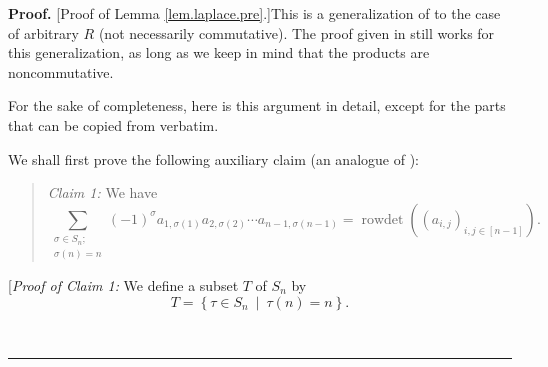 \documentclass[numbers=enddot,12pt,final,onecolumn,notitlepage,english]{scrartcl}%
\theoremstyle{definition}
\newenvironment{statement}{\begin{quote}}{\end{quote}}
\newenvironment{proof}[1][Proof]{\noindent\textbf{#1.} }{\ \rule{0.5em}{0.5em}}
\let\sumnonlimits\sum
\renewcommand{\sum}{\sumnonlimits\limits}
\newenvironment{verlong}{}{}
\begin{document}
\begin{verlong}
\begin{proof}
[Proof of Lemma \ref{lem.laplace.pre}.]This is a generalization of
\cite[Theorem 6.43]{detnotes} to the case of arbitrary $R$ (not necessarily
commutative). The proof given in \cite{detnotes} still works for this
generalization, as long as we keep in mind that the products are noncommutative.

For the sake of completeness, here is this argument in detail, except for the
parts that can be copied from \cite[proof of Theorem 6.43]{detnotes} verbatim.

We shall first prove the following auxiliary claim (an analogue of \cite[Lemma
6.44]{detnotes}):

\begin{statement}
\textit{Claim 1:} We have
\[
\sum_{\substack{\sigma\in S_{n};\\\sigma\left(  n\right)  =n}}\left(
-1\right)  ^{\sigma}a_{1,\sigma\left(  1\right)  }a_{2,\sigma\left(  2\right)
}\cdots a_{n-1,\sigma\left(  n-1\right)  }=\operatorname*{rowdet}\left(
\left(  a_{i,j}\right)  _{i,j\in\left[  n-1\right]  }\right)  .
\]

\end{statement}

[\textit{Proof of Claim 1:} We define a subset $T$ of $S_{n}$ by%
\[
T=\left\{  \tau\in S_{n}\ \mid\ \tau\left(  n\right)  =n\right\}  .
\]



\end{proof}
\end{verlong}
\end{document}

